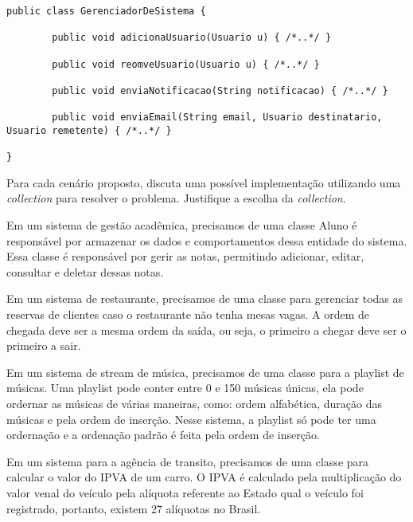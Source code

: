 \documentclass{lib/eng_softdoc}
\begin{document}
\vspace{1cm}

\subproblem
\begin{lstlisting}
public class GerenciadorDeSistema {

        public void adicionaUsuario(Usuario u) { /*..*/ }

        public void reomveUsuario(Usuario u) { /*..*/ }

        public void enviaNotificacao(String notificacao) { /*..*/ }

        public void enviaEmail(String email, Usuario destinatario, Usuario remetente) { /*..*/ }

} 
\end{lstlisting}
\vspace{0.5cm}

\problem Para cada cenário proposto, discuta uma possível implementação utilizando uma \textit{collection} para resolver o problema.
Justifique a escolha da \textit{collection}.

\vspace{0.5cm}
\subproblem Em um sistema de gestão acadêmica, precisamos de uma classe Aluno é responsável por armazenar os dados e comportamentos dessa entidade do sistema.
Essa classe é responsável por gerir as notas, permitindo adicionar, editar, consultar e deletar dessas notas.

\vspace{0.5cm}
\subproblem Em um sistema de restaurante, precisamos de uma classe para gerenciar todas as reservas de clientes caso o restaurante não tenha mesas vagas. A ordem de chegada deve ser a mesma ordem da saída, ou seja, o primeiro a chegar deve ser o primeiro a sair.  

\vspace{0.5cm}
\subproblem Em um sistema de stream de música, precisamos de uma classe para a playlist de músicas. Uma playlist pode conter entre 0 e 150 músicas únicas,
ela pode ordernar as músicas de várias maneiras, como: ordem alfabética, duração das músicas e pela ordem de inserção. Nesse sistema, a playlist só pode ter uma ordernação e a ordenação padrão é feita pela ordem de inserção. 

\vspace{0.5cm}
\subproblem Em um sistema para a agência de transito, precisamos de uma classe para calcular o valor do IPVA de um carro.
O IPVA é calculado pela multiplicação do valor venal do veículo pela alíquota referente ao Estado qual o veículo foi registrado,
portanto, existem 27 alíquotas no Brasil.
\end{document}
